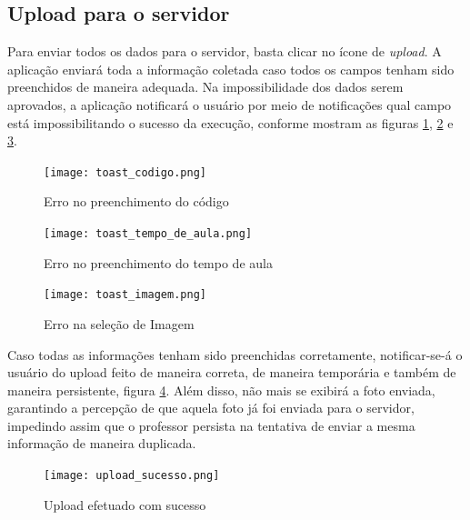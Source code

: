 \subsection{Upload para o servidor}
Para enviar todos os dados para o servidor, basta clicar no ícone de \textit{upload}. A aplicação enviará toda a informação coletada caso todos os campos tenham sido preenchidos de maneira adequada. Na impossibilidade dos dados serem aprovados, a aplicação notificará o usuário por meio de notificações qual campo está impossibilitando o sucesso da execução, conforme mostram as figuras \ref{fig:figura73}, \ref{fig:figura74} e \ref{fig:figura75}.

\begin{figure}[!ht]
	\centering
\texttt{[image: toast\_codigo.png]}   
	\caption{Erro no preenchimento do código}
	\label{fig:figura73}
\end{figure}

\begin{figure}[!ht]
	\centering
\texttt{[image: toast\_tempo\_de\_aula.png]}   
	\caption{Erro no preenchimento do tempo de aula}
	\label{fig:figura74}
\end{figure}

\begin{figure}[!ht]
	\centering
\texttt{[image: toast\_imagem.png]}   
	\caption{Erro na seleção de Imagem}
	\label{fig:figura75}
\end{figure}

Caso todas as informações tenham sido preenchidas corretamente, notificar-se-á o usuário do upload feito de maneira correta, de maneira temporária e também de maneira persistente, figura \ref{fig:figura76}. Além disso, não mais se exibirá a foto enviada, garantindo a percepção de que aquela foto já foi enviada para o servidor, impedindo assim que o professor persista na tentativa de enviar a mesma informação de maneira duplicada.

\begin{figure}[!ht]
	\centering
\texttt{[image: upload\_sucesso.png]}   
	\caption{Upload efetuado com sucesso}
	\label{fig:figura76}
\end{figure}
\newpage

